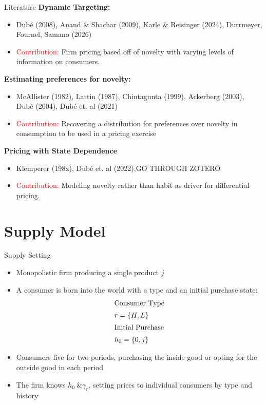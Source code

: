 \documentclass[aspectratio=169,professionalfonts]{beamer}
\newcommand{\shortbuttons}{}
\begin{document}
\gdef\shortbuttons{}
\begin{frame}[label=short-3]{Literature}
  \textbf{Dynamic Targeting:}
    \begin{itemize}
      \item Dub\'e (2008), Anand \& Shachar (2009), Karle \& Reisinger (2024), Durrmeyer, Fournel, Samano (2026)
      \item \textcolor{red}{Contribution:} Firm pricing based off of novelty with varying levels of information on consumers.
    \end{itemize}
  \textbf{Estimating preferences for novelty:}
  \begin{itemize}
      \item McAllister (1982), Lattin (1987), Chintagunta (1999), Ackerberg (2003), Dub\'e (2004), Dub\'e et. al (2021)
      \item \textcolor{red}{Contribution:} Recovering a distribution for preferences over novelty in consumption to be used in a pricing exercise
  \end{itemize}
  \textbf{Pricing with State Dependence}
  \begin{itemize}
    \item Klemperer (198x), Dub\'e et. al (2022),GO THROUGH ZOTERO
    \item \textcolor{red}{Contribution:} Modeling novelty rather than habit as driver for differential pricing.
  \end{itemize}
\end{frame}

\section{Supply Model}

\gdef\shortbuttons{}
\begin{frame}[label=short-6]{Supply Setting}
  \begin{itemize}
    \item Monopolistic firm producing a single product $j$
    \item A consumer is born into the world with a type and an initial purchase state:
    \begin{gather*}
      \shortintertext{Consumer Type} r = \{H, L\} \\
      \shortintertext{Initial Purchase} h_0 = \{0, j\}
    \end{gather*}
    \item Consumers live for two periods, purchasing the inside good or opting for the outside good in each period
    \item The firm knows $h_0\ \& \gamma_r$, setting prices to individual consumers by type and history
  \end{itemize}
\end{frame}
\end{document}
